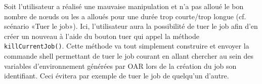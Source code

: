 \par Soit l’utilisateur a réalisé une mauvaise manipulation et n’a pas alloué le bon nombre de nœuds ou les a alloués pour une durée trop courte/trop longue (cf. scénario «Tuer le job»). Ici, l’utilisateur aura la possibilité de tuer le job afin d’en créer un nouveau à l’aide du bouton tuer qui appel la méthode \texttt{killCurrentJob()}. Cette méthode va tout simplement construire et envoyer la commande shell permettant de tuer le job courant en allant chercher au sein des variables d’environnement générées par OAR lors de la création du job son identifiant. Ceci évitera par exemple de tuer le job de quelqu’un d’autre.


